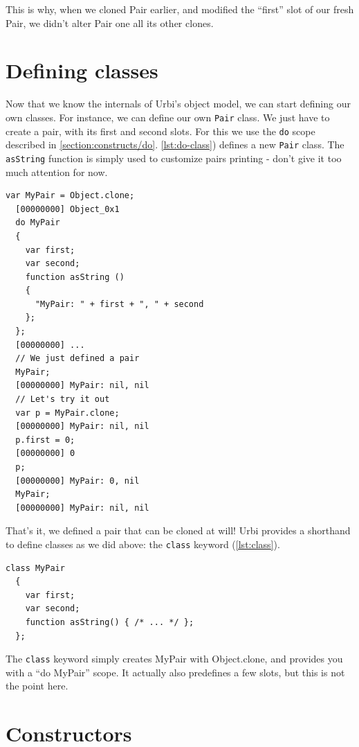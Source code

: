 \documentclass[openright,twoside,12pt]{report}
\newcommand{\urbi}{Urbi\xspace}
\newcommand{\lst}[1]{\autoref{lst:#1}}
\begin{document}
This is why, when we cloned Pair earlier, and modified the ``first''
slot of our fresh Pair, we didn't alter Pair one all its other clones.

\section{Defining classes}

Now that we know the internals of \urbi's object model, we can start
defining our own classes. For instance, we can define our own
\texttt{Pair} class. We just have to create a pair, with its first and
second slots. For this we use the \texttt{do} scope described in
\autoref{section:constructs/do}. \lst{do-class}) defines a new
\texttt{Pair} class. The \texttt{asString} function is simply used to
customize pairs printing - don't give it too much attention for now.

\begin{lstlisting}[caption=Defining our own \texttt{MyPair} class,
  label=lst:do-class]
  var MyPair = Object.clone;
  [00000000] Object_0x1
  do MyPair
  {
    var first;
    var second;
    function asString ()
    {
      "MyPair: " + first + ", " + second
    };
  };
  [00000000] ...
  // We just defined a pair
  MyPair;
  [00000000] MyPair: nil, nil
  // Let's try it out
  var p = MyPair.clone;
  [00000000] MyPair: nil, nil
  p.first = 0;
  [00000000] 0
  p;
  [00000000] MyPair: 0, nil
  MyPair;
  [00000000] MyPair: nil, nil
\end{lstlisting}

That's it, we defined a pair that can be cloned at will! \urbi
provides a shorthand to define classes as we did above: the
\texttt{class} keyword (\lst{class}).

\begin{lstlisting}[caption=Using the \texttt{class} construct,
  label=lst:class]
  class MyPair
  {
    var first;
    var second;
    function asString() { /* ... */ };
  };
\end{lstlisting}

The \texttt{class} keyword simply creates MyPair with Object.clone,
and provides you with a ``do MyPair'' scope. It actually also
predefines a few slots, but this is not the point here.

\section{Constructors}
\end{document}
